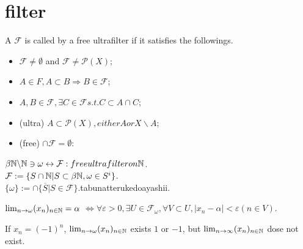 
\section{filter}

\begin{definition}
  A $\mathcal{F}$ is called by a free ultrafilter if it satisfies the followings.
  \begin{itemize}
    \item $\mathcal{F}\neq \emptyset$ and $\mathcal{F} \neq \mathcal{P}(X)$;
    \item $A \in F, A \subset B \Rightarrow B \in \mathcal{F}$;
    \item $A, B \in \mathcal{F}, \exists C \in \mathcal{F} s.t. C \subset A \cap C$;
    \item (ultra) $A \subset \mathcal{P}(X), either A or X \backslash A$;
    \item (free) $\cap \mathcal{F} = \emptyset $:
  \end{itemize}
\end{definition}

\begin{proposition}
  $\beta\mathbb{N}\backslash\mathbb{N} \ni \omega \leftrightarrow \mathcal{F}:free ultrafilter on \mathbb{N}$.\\
  $\mathcal{F} := \{S\cap\mathbb{N} | S\subset \beta\mathbb{N}, \omega \in S^{i}\}$.\\
  $\{\omega\} := \cap\{\overline{S} | S \in \mathcal{F} \}$.tabunatterukedoayashii.
\end{proposition}

\begin{remark}
  $\lim_{n \rightarrow \omega} (x_n)_{n \in \mathbb{N}} = \alpha$ $\Leftrightarrow \forall \varepsilon > 0, \exists U \in \mathcal{F}_\omega , \forall V \subset U, |x_n - \alpha| < \varepsilon (n \in V)$.
\end{remark}

\begin{remark}
  If $x_n = (-1)^n$,  $\lim_{n \rightarrow \omega} (x_n)_{n \in \mathbb{N}}$ exists $1$ or $-1$, but $\lim_{n \rightarrow \infty} (x_n)_{n \in \mathbb{N}}$ dose not exist.
\end{remark}
